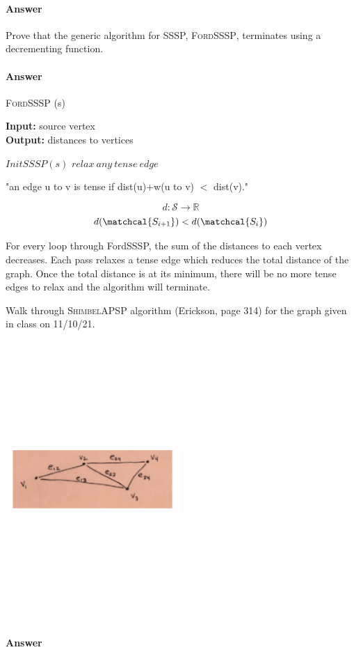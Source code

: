 \documentclass{article}
\begin{document}
\paragraph{Answer}


Prove that the generic algorithm for SSSP, \textsc{FordSSSP}, terminates using a
decrementing function.

\paragraph{Answer}

\begin{algorithm} \caption{\textsc{FordSSSP} (s)}\label{alg:seb}
    {\bf Input:} source vertex\\
    {\bf Output:} distances to vertices
    \begin{algorithmic}[1]
        \State$InitSSSP(s)$
            \State$relax\ any\ tense\ edge$
        \EndWhile\\
    \end{algorithmic}
\end{algorithm}

"an edge u to v is tense if dist(u)+w(u to v) $<$ dist(v)."

$$d : \mathcal{S} \rightarrow \mathbb{R}$$
$$d(\matchcal{S_{i+1}}) < d(\matchcal{S_i})$$

For every loop through FordSSSP, the sum of the distances to each vertex decreases.
Each pass relaxes a tense edge which reduces the total distance of the graph. Once
the total distance is at its minimum, there will be no more tense edges to relax
and the algorithm will terminate.


Walk through \textsc{ShimbelAPSP} algorithm (Erickson, page 314) for the graph given in class on
11/10/21.

\includegraphics[width=250,height=400,keepaspectratio]{432-111021-graph.png}

\paragraph{Answer}
\end{document}
